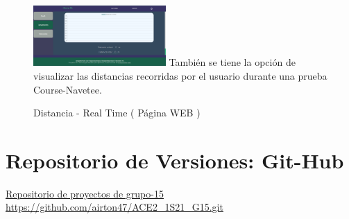 \documentclass[osajnl,twocolumn,showpacs,superscriptaddress,10pt]{revtex4-1}
\begin{document}
\begin{figure} [H] \centering 
\caption{Distancia - Real Time
 ( Página WEB )}
\includegraphics[width=0.45\textwidth]{09disntacia.png}
También se tiene la opción de visualizar las distancias recorridas por el usuario durante una prueba Course-Navetee.
\end{figure}

\section{Repositorio de Versiones: Git-Hub}
\href{https://github.com/airton47/ACE2_1S21_G15.git}{Repositorio de proyectos de grupo-15 \newline}
\newline
\url{https://github.com/airton47/ACE2_1S21_G15.git}
\end{document}
